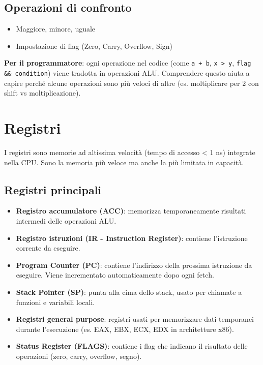 \documentclass[12pt,a4paper]{article}
\begin{document}
\subsection{Operazioni di confronto}
\begin{itemize}
    \item Maggiore, minore, uguale
    \item Impostazione di flag (Zero, Carry, Overflow, Sign)
\end{itemize}

\textbf{Per il programmatore}: ogni operazione nel codice (come \texttt{a + b}, \texttt{x > y}, \texttt{flag \&\& condition}) viene tradotta in operazioni ALU. Comprendere questo aiuta a capire perché alcune operazioni sono più veloci di altre (es. moltiplicare per 2 con shift vs moltiplicazione).

\section{Registri}
I registri sono memorie ad altissima velocità (tempo di accesso < 1 ns) integrate nella CPU. Sono la memoria più veloce ma anche la più limitata in capacità.

\subsection{Registri principali}
\begin{itemize}
    \item \textbf{\texorpdfstring{\colorbox{gray!50}{Registro accumulatore (ACC)}}{}}: memorizza temporaneamente risultati intermedi delle operazioni ALU.
    \item \textbf{Registro istruzioni (IR - Instruction Register)}: contiene l'istruzione corrente da eseguire.
    \item \textbf{Program Counter (PC)}: contiene l'indirizzo della prossima istruzione da eseguire. Viene incrementato automaticamente dopo ogni fetch.
    \item \textbf{Stack Pointer (SP)}: punta alla cima dello stack, usato per chiamate a funzioni e variabili locali.
    \item \textbf{Registri general purpose}: registri usati per memorizzare dati temporanei durante l'esecuzione (es. EAX, EBX, ECX, EDX in architetture x86).
    \item \textbf{\texorpdfstring{\colorbox{gray!50}{Status Register (FLAGS)}}{}}: contiene i flag che indicano il risultato delle operazioni (zero, carry, overflow, segno).
\end{itemize}
\end{document}
